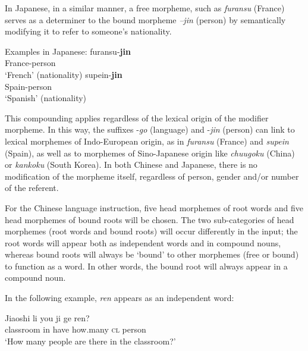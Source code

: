 \documentclass[output=paper,colorlinks,citecolor=brown,modfonts,nonflat]{../langscibook}
\begin{document}
In Japanese, in a similar manner, a free morpheme, such as \textit{furansu} (France) serves as a determiner to the bound morpheme \textit{–jin} (person) by semantically modifying it to refer to someone's nationality.


\ea%
    \label{ex:watorek:9}
    Examples in Japanese:
    \ea%
    \label{ex:watorek:9a}
        \gll    furansu-\textbf{{jin}}\\
                France-{person}\\
        \glt    ‘French’ (nationality)
    \ex%
    \label{ex:watorek:9b}
        \gll    supein-\textbf{{jin}}\\
                Spain-{person}\\
        \glt    ‘Spanish’ (nationality)
    \z
\z

This compounding applies regardless of the lexical origin of the modifier morpheme. In this way, the suffixes -\textit{go} (language) and -\textit{jin} (person) can link to lexical morphemes of Indo-European origin, as in \textit{furansu} (France) and \textit{supein} (Spain), as well as to morphemes of Sino-Japanese origin like \textit{chuugoku} (China) or \textit{kankoku} (South Korea). In both Chinese and Japanese, there is no modification of the morpheme itself, regardless of person, gender and/or number of the referent.

For the Chinese language instruction, five head morphemes of root words and five head morphemes of bound roots will be chosen. The two sub-categories of head morphemes (root words and bound roots) will occur differently in the input; the root words will appear both as independent words and in compound nouns, whereas bound roots will always be ‘bound’ to other morphemes (free or bound) to function as a word. In other words, the bound root will always appear in a compound noun.

In the following example, \textit{ren} appears as an independent word:

\ea%
    \label{ex:watorek:10}
    \gll    Jiaoshi li you ji ge ren?\\
            classroom in have how.many \textsc{cl} person\\
    \glt    ‘How many people are there in the classroom?’
\z
\end{document}
